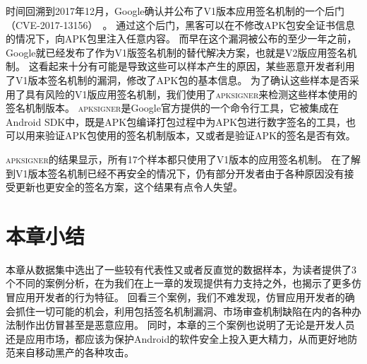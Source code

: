 时间回溯到2017年12月，Google确认并公布了V1版本应用签名机制的一个后门（CVE-2017-13156）~\cite{android_security_bulletin}。
通过这个后门，黑客可以在不修改APK包安全证书信息的情况下，向APK包里注入任意内容。
而早在这个漏洞被公布的至少一年之前，Google就已经发布了作为V1版签名机制的替代解决方案，也就是V2版应用签名机制。
这看起来十分有可能是导致这些可以样本产生的原因，某些恶意开发者利用了V1版本签名机制的漏洞，修改了APK包的基本信息。
为了确认这些样本是否采用了具有风险的V1版应用签名机制，我们使用了\textsc{apksigner}来检测这些样本使用的签名机制版本。
\textsc{apksigner}是Google官方提供的一个命令行工具，它被集成在Android SDK中，既是APK包编译打包过程中为APK包进行数字签名的工具，也可以用来验证APK包使用的签名机制版本，又或者是验证APK的签名是否有效。

\textsc{apksigner}的结果显示，所有17个样本都只使用了V1版本的应用签名机制。
在了解到V1版本签名机制已经不再安全的情况下，仍有部分开发者由于各种原因没有接受更新也更安全的签名方案，这个结果有点令人失望。

\section{本章小结}
本章从数据集中选出了一些较有代表性又或者反直觉的数据样本，为读者提供了3个不同的案例分析，在为我们在上一章的发现提供有力支持之外，也揭示了更多仿冒应用开发者的行为特征。
回看三个案例，我们不难发现，仿冒应用开发者的确会抓住一切可能的机会，利用包括签名机制漏洞、市场审查机制缺陷在内的各种办法制作出仿冒甚至是恶意应用。
同时，本章的三个案例也说明了无论是开发人员还是应用市场，都应该为保护Android的软件安全上投入更大精力，从而更好地防范来自移动黑产的各种攻击。
